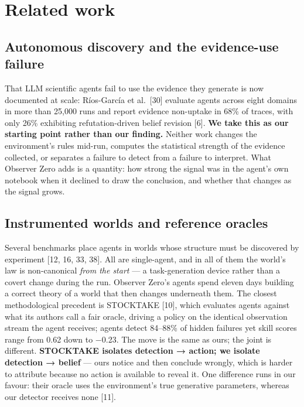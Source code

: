 \documentclass[pdflatex,sn-basic]{sn-jnl}
\begin{document}
\hypertarget{related-work}{%
\section{Related work}\label{related-work}}

\hypertarget{autonomous-discovery-and-the-evidence-use-failure}{%
\subsection{Autonomous discovery and the evidence-use failure}\label{autonomous-discovery-and-the-evidence-use-failure}}

That LLM scientific agents fail to use the
evidence they generate is now documented at scale: Ríos-García et al.~{[}30{]} evaluate agents across
eight domains in more than 25,000 runs and report evidence non-uptake in 68\% of traces, with only
26\% exhibiting refutation-driven belief revision {[}6{]}. \textbf{We take this as our starting point rather
than our finding.} Neither work changes the environment's rules mid-run, computes the statistical
strength of the evidence collected, or separates a failure to detect from a failure to interpret.
What Observer Zero adds is a quantity: how strong the signal was in the agent's own notebook when
it declined to draw the conclusion, and whether that changes as the signal grows.

\hypertarget{instrumented-worlds-and-reference-oracles}{%
\subsection{Instrumented worlds and reference oracles}\label{instrumented-worlds-and-reference-oracles}}

Several benchmarks place agents in worlds whose
structure must be discovered by experiment {[}12, 16, 33, 38{]}. All are single-agent, and in all of them
the world's law is non-canonical \emph{from the start} --- a task-generation device rather than a covert
change during the run. Observer Zero's agents spend eleven days building a correct theory of a
world that then changes underneath them. The closest methodological precedent is STOCKTAKE {[}10{]}, which evaluates
agents against what its authors call a fair oracle, driving a policy on the identical
observation stream the agent receives; agents detect 84--88\% of hidden failures yet skill scores range from
0.62 down to −0.23. The move is the same as ours; the joint is different. \textbf{STOCKTAKE isolates
detection → action; we isolate detection → belief} --- ours notice and then conclude wrongly, which
is harder to attribute because no action is available to reveal it. One difference runs in our
favour: their oracle uses the environment's true generative parameters, whereas our detector
receives none {[}11{]}.
\end{document}
